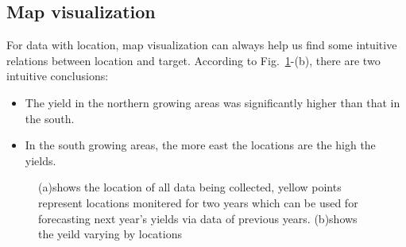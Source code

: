 \documentclass[conference]{IEEEtran}
\begin{document}
\subsection{Map visualization}
  For data with location, map visualization can always help us find some intuitive relations between location and target. According to Fig.~\ref{fig:Map_visual}-(b), there are two intuitive conclusions:
\begin{itemize}
    \item The yield in the northern growing areas was significantly higher than that in the south. 
    \item In the south growing areas, the more east the locations are the high the yields.
\end{itemize}

\begin{figure}[!htb]
    \centering
    \hfill
  \label{fig:Map_visual} 
  \caption{(a)shows the location of all data being collected, yellow points represent locations monitered for two years which can be used for forecasting next year's yields via data of previous years. (b)shows the yeild varying by locations}
\end{figure}
\end{document}
